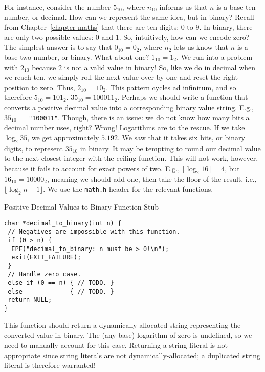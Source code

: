 For instance, consider the number $5_{10}$, where $n_{10}$ informs us that $n$ is a base ten number, or decimal. How can we represent the same idea, but in binary? Recall from Chapter~\ref{chapter-maths} that there are ten digits: $0$ to $9$. In binary, there are only two possible values: $0$ and $1$. So, intuitively, how can we encode zero? The simplest answer is to say that $0_{10} = 0_2$, where $n_{2}$ lets us know that $n$ is a base two number, or binary. What about one? $1_{10}=1_{2}$. We run into a problem with $2_{10}$ because $2$ is not a valid value in binary! So, like we do in decimal when we reach ten, we simply roll the next value over by one and reset the right position to zero. Thus, $2_{10} = 10_{2}$. This pattern cycles ad infinitum, and so therefore $5_{10} = 101_{2}$. $35_{10} = 100011_{2}$. Perhaps we should write a function that converts a positive decimal value into a corresponding binary value string. E.g., $35_{10} =$ \texttt{"100011"}. Though, there is an issue: we do not know how many bits a decimal number uses, right? Wrong! Logarithms are to the rescue. If we take $\log_{2}{35}$, we get approximately $5.192$. We saw that it takes six bits, or binary digits, to represent $35_{10}$ in binary. It may be tempting to round our decimal value to the next closest integer with the ceiling function. This will not work, however, because it fails to account for exact powers of two. E.g., $\lceil{}\log_{2}{16}\rceil{}=4$, but $16_{10}=10000_{2}$, meaning we should add one, then take the floor of the result, i.e., $\lfloor{}\log_2{n}+1\rfloor{}$. We use the \texttt{math.h} header for the relevant functions.

\begin{cl}[main.c]{Positive Decimal Values to Binary Function Stub}\begin{lstlisting}[language=MyC]
char *decimal_to_binary(int n) {
 // Negatives are impossible with this function.
 if (0 > n) {
  EPF("decimal_to_binary: n must be > 0!\n");
  exit(EXIT_FAILURE);
 }
 // Handle zero case.    
 else if (0 == n) { // TODO. } 
 else             { // TODO. }
 return NULL;
}
\end{lstlisting}\end{cl}

This function should return a dynamically-allocated string representing the converted value in binary. The (any base) logarithm of zero is undefined, so we need to manually account for this case. Returning a string literal is not appropriate since string literals are not dynamically-allocated; a duplicated string literal is therefore warranted!

